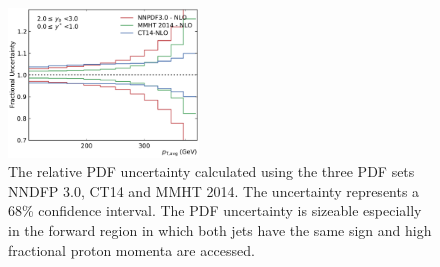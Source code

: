 \begin{figure}[htbp]
    \includegraphics[width=0.45\textwidth]{figures/theory/pdf_unc_comparison_yb2ys0.pdf}
    \caption{The relative PDF uncertainty calculated using the three PDF sets
    NNDFP 3.0, CT14 and MMHT 2014. The uncertainty represents a 68\% confidence
    interval. The PDF uncertainty is sizeable especially in the forward region in
    which both jets have the same sign and high fractional proton momenta are
    accessed. }
    \label{fig:pdf_uncertainties}
\end{figure}

